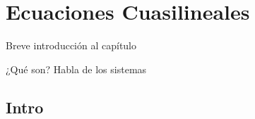 \chapter{Ecuaciones Cuasilineales}\label{cap:cuasilineal}

Breve introducción al capítulo

¿Qué son? 
Habla de los sistemas

\section{Intro}